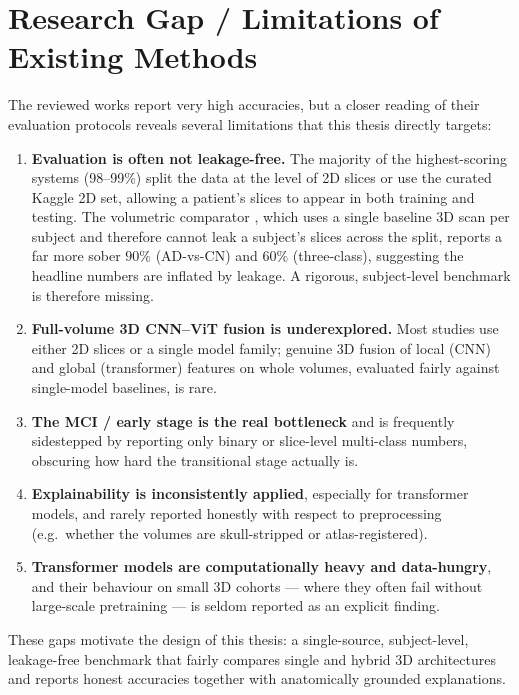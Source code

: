 \section{Research Gap / Limitations of Existing Methods}
The reviewed works report very high accuracies, but a closer reading of their evaluation protocols reveals several limitations that this thesis directly targets:
\begin{enumerate}
    \item \textbf{Evaluation is often not leakage-free.} The majority of the highest-scoring systems (98--99\%) split the data at the level of 2D slices or use the curated Kaggle 2D set, allowing a patient's slices to appear in both training and testing. The volumetric comparator \cite{saoud2024explainable}, which uses a single baseline 3D scan per subject and therefore cannot leak a subject's slices across the split, reports a far more sober $90\%$ (AD-vs-CN) and $60\%$ (three-class), suggesting the headline numbers are inflated by leakage. A rigorous, subject-level benchmark is therefore missing.
    \item \textbf{Full-volume 3D CNN--ViT fusion is underexplored.} Most studies use either 2D slices or a single model family; genuine 3D fusion of local (CNN) and global (transformer) features on whole volumes, evaluated fairly against single-model baselines, is rare.
    \item \textbf{The MCI / early stage is the real bottleneck} and is frequently sidestepped by reporting only binary or slice-level multi-class numbers, obscuring how hard the transitional stage actually is.
    \item \textbf{Explainability is inconsistently applied}, especially for transformer models, and rarely reported honestly with respect to preprocessing (e.g.\ whether the volumes are skull-stripped or atlas-registered).
    \item \textbf{Transformer models are computationally heavy and data-hungry}, and their behaviour on small 3D cohorts --- where they often fail without large-scale pretraining --- is seldom reported as an explicit finding.
\end{enumerate}
These gaps motivate the design of this thesis: a single-source, subject-level, leakage-free benchmark that fairly compares single and hybrid 3D architectures and reports honest accuracies together with anatomically grounded explanations.

